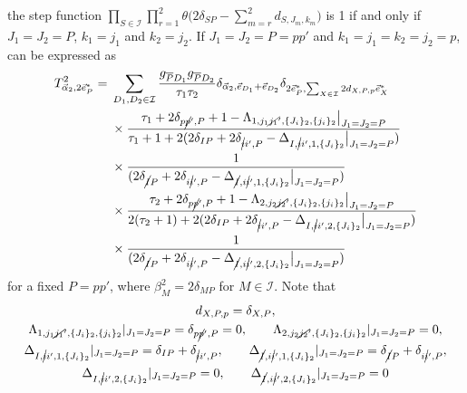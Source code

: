 \documentclass[pdftex]{sigma}
\numberwithin{equation}{section}
\begin{document}
the step function
$
\prod_{
S
\in
\mathcal{I}
}
\prod_{r=1}^{2}
\theta
\bigl(
 2
 \delta_{SP}
 -
 \sum_{m=r}^{2}
 d_{S,J_{m},k_{m}}
\bigr)
$
is 1 if and only if $J_{1}=J_{2}=P$, $k_{1}=j_{1}$ and $k_{2}=j_{2}$. If $J_{1}=J_{2}=P=pp'$ and $k_{1}=j_{1}=k_{2}=j_{2}=p$,  can be expressed as
\begin{align}
 T^{2}_{\vec{\alpha}_{2},2\vec{e}_{P}^{\ast}}
 ={}&
 \sum_{
 D_{1},
 D_{2}
 \in
 \mathcal{I}
 }
 \frac{
 g_{\overline{P}D_{1}}
 g_{\overline{P}D_{2}}
 }{
 \tau_{1}
 \tau_{2}
 }
 \delta_{
 \vec{\alpha}_{2},
 \vec{e}_{D_{1}}
 +
 \vec{e}_{D_{2}}
 }
 \delta_{
 2
 \vec{e}_{P}^{\ast},
 \sum_{
 X
 \in
 \mathcal{I}
 }
 2
 d_{
 X,
 P,
 p
 }
 \vec{e}_{X}^{\ast}
 }
 \nonumber
 \\
 &
 \times
 \frac{
 \tau_{1}
 +
 2
 \delta_{p\cancel{p}',P}
 +
 1
 -
 \Lambda_{
 1,
 j_{1}\cancel{j_{1}}',
 \{
 J_{i}
 \}_{2},
 \{
 j_{i}
 \}_{2}
 }
 \big|_{J_{1}=J_{2}=P}
 }{
 \tau_{1}+1
 +
 2
 (
 2
 \delta_{IP}
 +
 2
 \delta_{\cancel{i}i',P}
 -
 \Delta_{
 I,
 \cancel{i}i',
 1,
 \{
 J_{i}
 \}_{2}
 }
 \big|_{J_{1}=J_{2}=P}
 )
 }
 \nonumber
 \\
 &\times\frac{1}{ (
 2
 \delta_{\cancel{I}P}
 +
 2
 \delta_{i\cancel{i}',P}
 -
 \Delta_{
 \cancel{I},
 i\cancel{i}',
 1,
 \{
 J_{i}
 \}_{2}
 }
 \big|_{J_{1}=J_{2}=P}
 )}\nonumber\\
 &
 \times
 \frac{
 \tau_{2}
 +
 2
 \delta_{p\cancel{p}',P}
 +
 1
 -
 \Lambda_{
 2,
 j_{2}\cancel{j_{2}}',
 \{
 J_{i}
 \}_{2},
 \{
 j_{i}
 \}_{2}
 }
 \big|_{J_{1}=J_{2}=P}
 }{
 2
 (
 \tau_{2}+1
 )
 +
 2
 (
 2
 \delta_{IP}
 +
 2
 \delta_{\cancel{i}i',P}
 -
 \Delta_{
 I,
 \cancel{i}i',
 2,
 \{
 J_{i}
 \}_{2}
 }
 \big|_{J_{1}=J_{2}=P}
 )
 }
 \nonumber\\
 &\times\frac{1}{ (
 2
 \delta_{\cancel{I}P}
 +
 2
 \delta_{i\cancel{i}',P}
 -
 \Delta_{
 \cancel{I},
 i\cancel{i}',
 2,
 \{
 J_{i}
 \}_{2}
 }
 \big|_{J_{1}=J_{2}=P}
 )}\label{star_coeff_G24_n2_2P}
\end{align}
for a fixed $P=pp'$, where
$
\beta_{M}^{2}
=
2\delta_{MP}
$
for
$
M
\in
\mathcal{I}
$.
Note that
\begin{gather}
d_{
 X,
 P,
 p
}
=
\delta_{
 X,
 P
},
\label{d_calc_2}
\\
\Lambda_{
 1,
 j_{1}\cancel{j_{1}}',
 \{
 J_{i}
 \}_{2},
 \{
 j_{i}
 \}_{2}
}
|_{J_{1}=J_{2}=P}
=
\delta_{p\cancel{p}',P}
=
0
,
\qquad
\Lambda_{
 2,
 j_{2}\cancel{j_{2}}',
 \{
 J_{i}
 \}_{2},
 \{
 j_{i}
 \}_{2}
}
|_{J_{1}=J_{2}=P}
=
0,
\label{lambda_calc_1and2}
\\
\Delta_{
I,
\cancel{i}i',
1,
\{
 J_{i}
\}_{2}
}
|_{J_{1}=J_{2}=P}
=
\delta_{IP}
+
\delta_{\cancel{i}i',P},
\qquad
\Delta_{
\cancel{I},
i\cancel{i}',
1,
\{
 J_{i}
\}_{2}
}
|_{J_{1}=J_{2}=P}
=
\delta_{\cancel{I}P}
+
\delta_{i\cancel{i}',P},
\label{Delta_calc_1}
\\
\Delta_{
I,
\cancel{i}i',
2,
\{
 J_{i}
\}_{2}
}
|_{J_{1}=J_{2}=P}
=
0,
\qquad
\Delta_{
\cancel{I},
i\cancel{i}',
2,
\{
 J_{i}
\}_{2}
}
|_{J_{1}=J_{2}=P}
=
0
\label{Delta_calc_2}
\end{gather}
\end{document}

